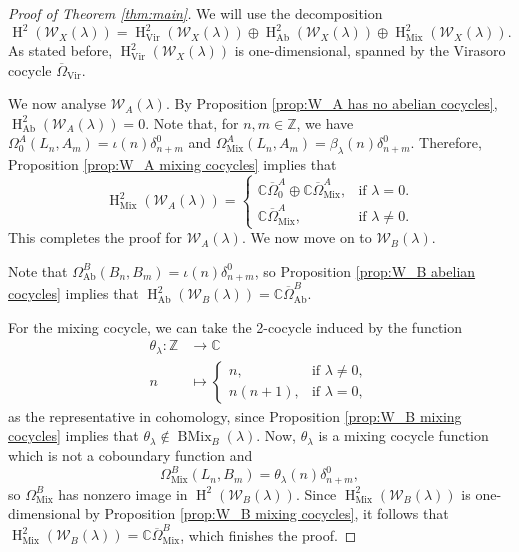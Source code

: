 \documentclass[11pt, svgnames]{amsart}
\DeclareMathOperator{\Vir}{Vir}
\newcommand{\ZZ}{\mathbb{Z}}
\newcommand{\CC}{\mathbb{C}}
\newcommand{\W}{\mathcal{W}}
\DeclareMathOperator{\HH}{H}
\DeclareMathOperator{\Ab}{Ab}
\DeclareMathOperator{\Mix}{Mix}
\DeclareMathOperator{\BMix}{BMix}
\theoremstyle{definition}
\begin{document}
\begin{proof}[Proof of Theorem \ref{thm:main}]
    We will use the decomposition
    $$\HH^2(\W_X(\lambda)) = \HH_{\Vir}^2(\W_X(\lambda)) \oplus \HH_{\Ab}^2(\W_X(\lambda)) \oplus \HH_{\Mix}^2(\W_X(\lambda)).$$
    As stated before, $\HH_{\Vir}^2(\W_X(\lambda))$ is one-dimensional, spanned by the Virasoro cocycle $\overline{\Omega}_{\Vir}$.
    
    We now analyse $\W_A(\lambda)$. By Proposition \ref{prop:W_A has no abelian cocycles}, $\HH_{\Ab}^2(\W_A(\lambda)) = 0$. Note that, for $n,m \in \ZZ$, we have $\Omega_0^A(L_n,A_m) = \iota(n)\delta_{n+m}^0$ and $\Omega_{\Mix}^A(L_n,A_m) = \beta_\lambda(n)\delta_{n+m}^0$. Therefore, Proposition \ref{prop:W_A mixing cocycles} implies that
    $$\HH_{\Mix}^2(\W_A(\lambda)) =
    \begin{cases}
        \CC \overline{\Omega}_0^A \oplus \CC \overline{\Omega}_{\Mix}^A, &\text{if } \lambda=0.\\
        \CC \overline{\Omega}_{\Mix}^A, &\text{if } \lambda \neq 0.
    \end{cases}$$
    This completes the proof for $\W_A(\lambda)$. We now move on to $\W_B(\lambda)$.

    Note that $\Omega_{\Ab}^B(B_n,B_m) = \iota(n)\delta_{n+m}^0$, so Proposition \ref{prop:W_B abelian cocycles} implies that $\HH_{\Ab}^2(\W_B(\lambda)) = \CC \overline{\Omega}_{\Ab}^B$.

    For the mixing cocycle, we can take the 2-cocycle induced by the function
    \begin{align*}
        \theta_\lambda \colon \ZZ &\to \CC \\
        n &\mapsto \begin{cases}
            n, &\text{if } \lambda \neq 0, \\
            n(n + 1), &\text{if } \lambda = 0,
        \end{cases}
    \end{align*}
    as the representative in cohomology, since Proposition \ref{prop:W_B mixing cocycles} implies that $\theta_\lambda \notin \BMix_B(\lambda)$. Now, $\theta_\lambda$ is a mixing cocycle function which is not a coboundary function and
    $$\Omega_{\Mix}^B(L_n,B_m) = \theta_\lambda(n)\delta_{n+m}^0,$$
    so $\Omega_{\Mix}^B$ has nonzero image in $\HH^2(\W_B(\lambda))$. Since $\HH_{\Mix}^2(\W_B(\lambda))$ is one-dimensional by Proposition \ref{prop:W_B mixing cocycles}, it follows that $\HH_{\Mix}^2(\W_B(\lambda)) = \CC \overline{\Omega}_{\Mix}^B$, which finishes the proof.
\end{proof}
\end{document}
